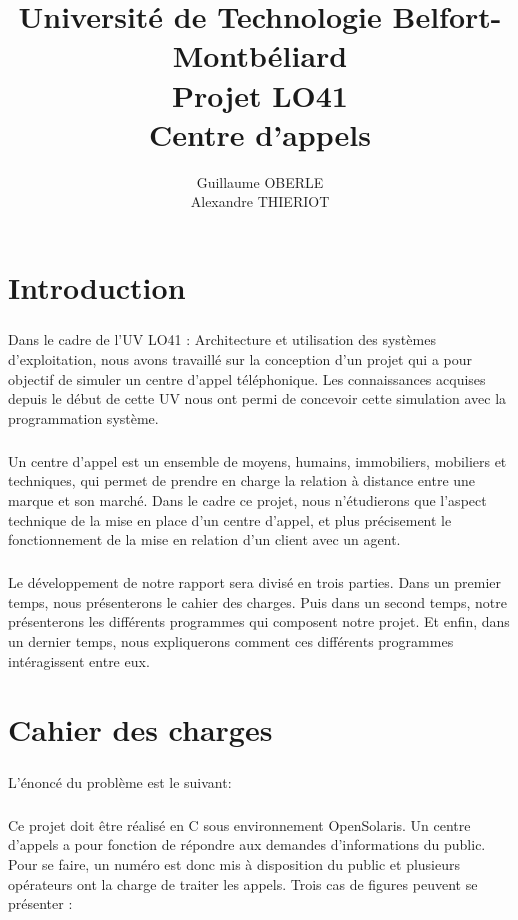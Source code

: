 \documentclass{report}
\title{Université de Technologie Belfort-Montbéliard\\
Projet LO41\\
Centre d'appels}
\author{Guillaume OBERLE\\
Alexandre THIERIOT}
\begin{document}


\maketitle

\tableofcontents

\chapter{Introduction}
	\paragraph{}
		Dans le cadre de l'UV LO41 : Architecture et utilisation des systèmes d'exploitation, nous avons travaillé sur la conception d'un projet qui a pour objectif de simuler un centre d'appel téléphonique. Les connaissances acquises depuis le début de cette UV nous ont permi de concevoir cette simulation avec la programmation système.
	\paragraph{}
		Un centre d'appel est un ensemble de moyens, humains, immobiliers, mobiliers et techniques, qui permet de prendre en charge la relation à distance entre une marque et son marché. Dans le cadre ce projet, nous n'étudierons que l'aspect technique de la mise en place d'un centre d'appel, et plus précisement le fonctionnement de la mise en relation d'un client avec un agent.
	\paragraph{}
		Le développement de notre rapport sera divisé en trois parties. Dans un premier temps, nous présenterons le cahier des charges. Puis dans un second temps, notre présenterons les différents programmes qui composent notre projet. Et enfin, dans un dernier temps, nous expliquerons comment ces différents programmes intéragissent entre eux.

\chapter{Cahier des charges}
	\paragraph{}
	L'énoncé du problème est le suivant:
	\paragraph{}
		Ce projet doit être réalisé en C sous environnement OpenSolaris. Un centre d'appels a pour fonction de répondre aux demandes d'informations du public. Pour se faire, un numéro est donc mis à disposition du public et plusieurs opérateurs ont la charge de traiter les appels. Trois cas de figures peuvent se présenter :
\end{document}
